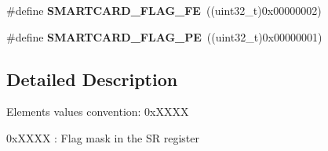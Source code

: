 \begin{DoxyCompactItemize}
\item 
\#define {\bfseries S\+M\+A\+R\+T\+C\+A\+R\+D\+\_\+\+F\+L\+A\+G\+\_\+\+FE}~((uint32\+\_\+t)0x00000002)\hypertarget{group___smart_card___flags_gaa85318d22a73dbbf1498363545999bf3}{}\label{group___smart_card___flags_gaa85318d22a73dbbf1498363545999bf3}

\item 
\#define {\bfseries S\+M\+A\+R\+T\+C\+A\+R\+D\+\_\+\+F\+L\+A\+G\+\_\+\+PE}~((uint32\+\_\+t)0x00000001)\hypertarget{group___smart_card___flags_ga19dfcc02f14bb270f559601cca5f433d}{}\label{group___smart_card___flags_ga19dfcc02f14bb270f559601cca5f433d}

\end{DoxyCompactItemize}


\subsection{Detailed Description}
Elements values convention\+: 0x\+X\+X\+XX
\begin{DoxyItemize}
\item 0x\+X\+X\+XX \+: Flag mask in the SR register 
\end{DoxyItemize}